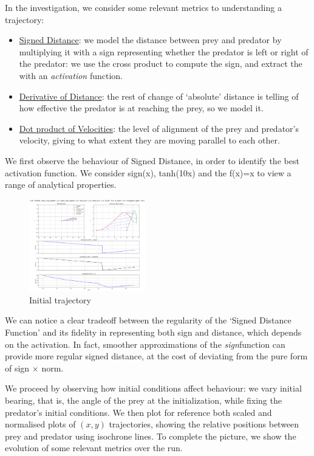 \documentclass[11pt, twocolumn]{article}
\begin{document}
        In the investigation, we consider some relevant metrics to understanding a trajectory:
        \begin{itemize}
          \item \underline{Signed Distance}: we model the distance between prey and predator by multiplying it with a sign representing whether the predator is left or right of the predator: we use the cross product to compute the sign, and extract the with an \textit{activation} function.
          \item \underline{Derivative of Distance}: the rest of change of `absolute' distance is telling of how effective the predator is at reaching the prey, so we model it.
          \item \underline{Dot product of Velocities}: the level of alignment of the prey and predator's velocity, giving to what extent they are moving parallel to each other.
        \end{itemize}

        We first observe the behaviour of Signed Distance, in order to identify the best activation function. We consider sign(x), tanh(10x) and the f(x)=x to view a range of analytical properties.
        \begin{figure}[H]
          \centering
          \includegraphics[width=0.45\textwidth]{figures/signed_distance.png}
          \caption{Initial trajectory}
          \label{fig:trajectory}
        \end{figure}

        We can notice a clear tradeoff between the regularity of the `Signed Distance Function' and its fidelity in representing both sign and distance, which depends on the activation. In fact, smoother approximations of the \textit{sign}function can provide more regular signed distance, at the cost of deviating from the pure form of sign $\times$ norm.

        We proceed by observing how initial conditions affect behaviour: we vary initial bearing, that is, the angle of the prey at the initialization, while fixing the predator's initial conditions. We then plot for reference both scaled and normalised plots of $(x,y)$ trajectories, showing the relative positions between prey and predator using isochrone lines. To complete the picture, we show the evolution of some relevant metrics over the run.
\end{document}
